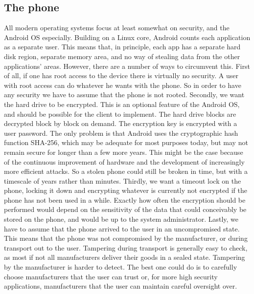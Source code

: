 \subsection{The phone}
All modern operating systems focus at least somewhat on security, and the Android OS especially. Building on a Linux core, Android counts each application as a separate user. This means that, in principle, each app has a separate hard disk region, separate memory area, and no way of stealing data from the other applications’ areas. However, there are a number of ways to circumvent this.
\newline
\newline
First of all, if one has root access to the device there is virtually no security. A user with root access can do whatever he wants with the phone. So in order to have any security we have to assume that the phone is not rooted.
\newline
\newline
Secondly, we want the hard drive to be encrypted. This is an optional feature of the Android OS, and should be possible for the client to implement. The hard drive blocks are decrypted block by block on demand. The encryption key is encrypted with a user password. The only problem is that Android uses the cryptographic hash function SHA-256, which may be adequate for most purposes today, but may not remain secure for longer than a few more years. This might be the case because of the continuous improvement of hardware and the development of increasingly more efficient attacks. So a stolen phone could still be broken in time, but with a timescale of years rather than minutes. 
\newline
\newline
Thirdly, we want a timeout lock on the phone, locking it down and encrypting whatever is currently not encrypted if the phone has not been used in a while. Exactly how often the encryption should be performed would depend on the sensitivity of the data that could conceivably be stored on the phone, and would be up to the system administrator.
Lastly, we have to assume that the phone arrived to the user in an uncompromised state. This means that the phone was not compromised by the manufacturer, or during transport out to the user. Tampering during transport is generally easy to check, as most if not all manufacturers deliver their goods in a sealed state. Tampering by the manufacturer is harder to detect. The best one could do is to carefully choose manufacturers that the user can trust or, for more high security applications, manufacturers that the user can maintain careful oversight over.

